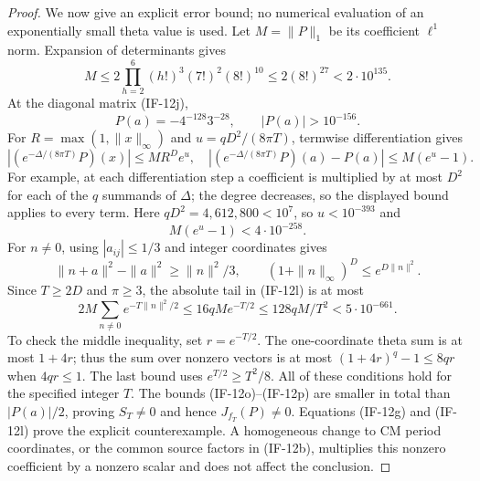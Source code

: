 \documentclass[11pt,a4paper]{article}
\theoremstyle{definition}
\theoremstyle{remark}
\begin{document}
\begin{proof}
We now give an explicit error bound; no numerical evaluation of an
exponentially small theta value is used. Let $M=\|P\|_1$ be its
coefficient $\ell^1$ norm. Expansion of determinants gives
\[
 M\le 2\prod_{h=2}^{6}(h!)^3(7!)^2(8!)^{10}
                  \le2(8!)^{27}<2\cdot10^{135}.                \tag{IF-12m}
\]
At the diagonal matrix (IF-12j),
\[
           P(a)=-4^{-128}3^{-28},\qquad |P(a)|>10^{-156}.
                                                               \tag{IF-12n}
\]
For $R=\max(1,\|x\|_\infty)$ and
$u=qD^2/(8\pi T)$, termwise differentiation gives
\[
 |(e^{-\Delta/(8\pi T)}P)(x)|\le M R^D e^u,
 \quad |(e^{-\Delta/(8\pi T)}P)(a)-P(a)|\le M(e^u-1).
\]
For example, at each differentiation step a coefficient is
multiplied by at most $D^2$ for each of the $q$ summands of $\Delta$;
the degree decreases, so the displayed bound applies to every term.
Here $qD^2=4{,}612{,}800<10^7$, so $u<10^{-393}$ and
\[
                  M(e^u-1)<4\cdot10^{-258}.                   \tag{IF-12o}
\]
For $n\ne0$, using $|a_{ij}|\le1/3$ and integer coordinates gives
\[
 \|n+a\|^2-\|a\|^2\ge\|n\|^2/3,
 \qquad
 (1+\|n\|_\infty)^D\le e^{D\|n\|^2}.
\]
Since $T\ge2D$ and $\pi\ge3$, the absolute tail in (IF-12l) is at
most
\[
 2M\sum_{n\ne0}e^{-T\|n\|^2/2}
 \le16qM e^{-T/2}
 \le128qM/T^2
 <5\cdot10^{-661}.                                            \tag{IF-12p}
\]
To check the middle inequality, set $r=e^{-T/2}$. The
one-coordinate theta sum is at most $1+4r$; thus the sum over
nonzero vectors is at most $(1+4r)^q-1\le8qr$ when $4qr\le1$.
The last bound uses $e^{T/2}\ge T^2/8$. All of these conditions
hold for the specified integer $T$. The bounds (IF-12o)--(IF-12p)
are smaller in total than $|P(a)|/2$, proving $S_T\ne0$ and hence
$J_{f_T}(P)\ne0$. Equations (IF-12g) and (IF-12l) prove the explicit
counterexample. A homogeneous change to CM period coordinates, or
the common source factors in (IF-12b), multiplies this nonzero
coefficient by a nonzero scalar and does not affect the conclusion.


\end{proof}
\end{document}
